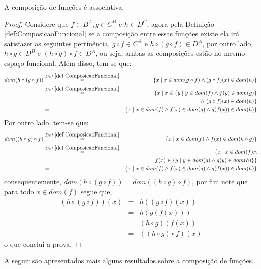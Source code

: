 \begin{proposicao}\label{prop:AssociativaComposicaoFuncao}
  A composição de funções é associativa.
\end{proposicao}

\begin{proof}
  Considere que $f \in B^A, g \in C^B$ e $h \in D^C$, agora pela Definição \ref{def:ComposicaoFuncional} se a composição entre essas funções existe ela irá satisfazer as seguintes pertinência, $g \circ f \in C^A$ e $h \circ (g \circ f) \in D^A$, por outro lado, $h \circ g \in D^B$ e $(h \circ g) \circ f \in D^A$, ou seja, ambas as composições estão no mesmo espaço funcional. Além disso, tem-se que:
	\begin{eqnarray*}
		dom(h \circ (g \circ f)) & \stackrel{Def. \ref{def:ComposicaoFuncional}}{=} & \{x \mid x \in dom(g \circ f) \land (g \circ f)(x) \in dom(h)\}\\
		& \stackrel{Def. \ref{def:ComposicaoFuncional}}{=} & \{x \mid x \in \{y \mid y \in dom(f) \land f(y) \in dom(g)\}\\ 
		& & \land \ (g \circ f)(x) \in dom(h)\}\\
		& = & \{x \mid x \in dom(f) \land f(x) \in dom(g) \land g(f(x)) \in dom(h)\}
	\end{eqnarray*}
	Por outro lado, tem-se que:
	\begin{eqnarray*}
		dom((h \circ g) \circ f) & \stackrel{Def. \ref{def:ComposicaoFuncional}}{=} & \{x \mid x \in dom(f) \land f(x) \in dom(h \circ g)\}\\
		& \stackrel{Def. \ref{def:ComposicaoFuncional}}{=} & \{x \mid x \in dom(f) \land\\ 
		& & f(x) \in \{y \mid y \in dom(g) \land g(y) \in dom(h)\} \}\\
		& = & \{x \mid x \in dom(f) \land f(x) \in dom(g) \land g(f(x)) \in dom(h)\}
	\end{eqnarray*}
	consequentemente, $dom(h \circ (g \circ f)) = dom((h \circ g) \circ f)$, por fim note que para todo $x \in dom(f)$ segue que,
	\begin{eqnarray*}
		(h \circ (g \circ f))(x) & = & h( (g \circ f)(x))\\
		& = & h(g(f(x)))\\
		& = & (h \circ g)(f(x))\\
		& = & ((h \circ g) \circ f)(x)
	\end{eqnarray*}
	o que conclui a prova.
\end{proof}

A seguir são apresentados mais alguns resultados sobre a composição de funções.

